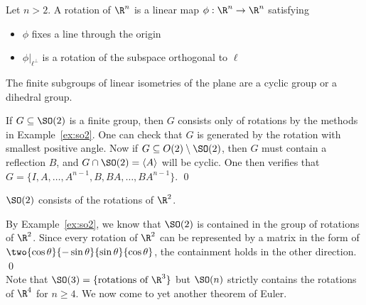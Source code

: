 \begin{dfn}[Rotation of $\R^n$]
Let $n>2$. A rotation of $\R^n$ is a linear map $\phi: \R^n \to \R^n$ satisfying
	\begin{itemize}
	\item $\phi$ fixes a line through the origin
	\item $\phi \big|_{\ell^\perp}$ is a rotation of the subspace orthogonal to $\ell$
	\end{itemize}
\end{dfn}
%


\begin{thm}
The finite subgroups of linear isometries of the plane are a cyclic group or a dihedral group. 
\end{thm}

\pfsk If $G \subseteq \SO(2)$ is a finite group, then $G$ consists only of rotations by the methods in Example~\ref{ex:so2}. One can check that $G$ is generated by the rotation with smallest positive angle. Now if $G \subseteq O(2) \setminus \SO(2)$, then $G$ must contain a reflection $B$, and $G \cap \SO(2)= \langle A \rangle$ will be cyclic. One then verifies that $G= \{I,A, \ldots, A^{n-1}, B, BA, \ldots, BA^{n-1}\}$. \qed \\


\begin{cor}
$\SO(2)$ consists of the rotations of $\R^2$. 
\end{cor}

\pf By Example~\ref{ex:so2}, we know that $\SO(2)$ is contained in the group of rotations of $\R^2$. Since every rotation of $\R^2$ can be represented by a matrix in the form of $\two{\cos\theta}{-\sin\theta}{\sin\theta}{\cos\theta}$, the containment holds in the other direction. \qed \\


Note that $\SO(3)=\{\text{rotations of }\R^3\}$ but $\SO(n)$ strictly contains the rotations of $\R^4$ for $n \geq 4$. We now come to yet another theorem of Euler. 


